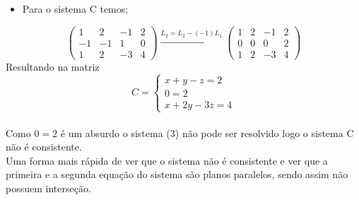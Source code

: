 \documentclass{article}
\begin{document}
      \begin{itemize}
          \item Para o sistema C temos;
      \end{itemize}
    \begin{equation*}\begin{pmatrix}
      1 & 2 & -1 &2 \\ 
       -1& -1 &  1& 0\\ 
       1&  2&  -3& 4
      \end{pmatrix}
      \xrightarrow[]{L_2=L_2 - (-1)L_1} 
      \begin{pmatrix}
      1 & 2 & -1 &2 \\ 
       0& 0 &  0& 2\\ 
       1&  2&  -3& 4
      \end{pmatrix}\end{equation*}
 Resultando na matriz
\begin{equation}
  C = \left\{\begin{matrix}  x + y - z = 2 \\ 0 = 2 \\ x+2y-3z=4 \end{matrix}\right.
\end{equation} 
\\
Como $0=2$ é um absurdo o sistema (3) não pode ser resolvido logo o sistema C não é consistente.\\
Uma forma mais rápida de ver que o sistema não é consistente e ver que a primeira e a segunda equação do sistema são planos paralelos, sendo assim não possuem interseção.
\end{document}

